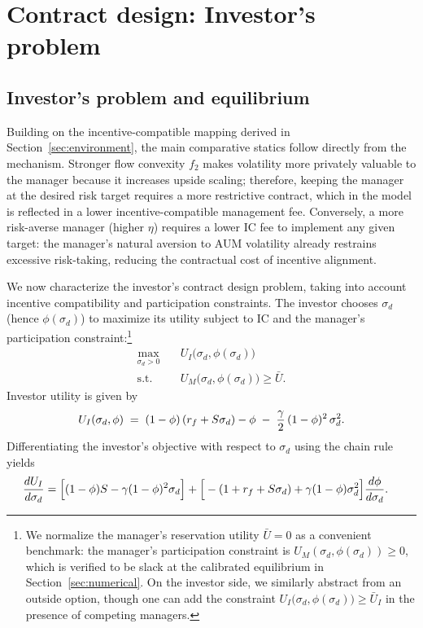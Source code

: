 \section{Contract design: Investor's problem}
\label{sec:contract}
\subsection{Investor's problem and equilibrium}
\label{sec:investor}

Building on the incentive-compatible mapping derived in Section~\ref{sec:environment}, the main comparative statics follow directly from the mechanism. Stronger flow convexity $f_2$ makes volatility more privately valuable to the manager because it increases upside scaling; therefore, keeping the manager at the desired risk target requires a more restrictive contract, which in the model is reflected in a lower incentive-compatible management fee. Conversely, a more risk-averse manager (higher $\eta$) requires a lower IC fee to implement any given target: the manager's natural aversion to AUM volatility already restrains excessive risk-taking, reducing the contractual cost of incentive alignment.

We now characterize the investor's contract design problem, taking into account incentive compatibility and participation constraints. The investor chooses \(\sigma_d\) (hence \(\phi(\sigma_d)\)) to maximize its utility subject to IC and the manager's participation constraint:\footnote{We normalize the manager's reservation utility $\bar{U} = 0$ as a convenient benchmark: the manager's participation constraint is $U_M(\sigma_d, \phi(\sigma_d)) \ge 0$, which is verified to be slack at the calibrated equilibrium in Section~\ref{sec:numerical}. On the investor side, we similarly abstract from an outside option, though one can add the constraint $U_I\big(\sigma_d,\phi(\sigma_d)\big) \geq \bar{U}_I$ in the presence of competing managers.}
\begin{align}
\max_{\sigma_d>0}\quad & U_I\big(\sigma_d,\phi(\sigma_d)\big) \\
\text{s.t.}\quad & U_M\big(\sigma_d,\phi(\sigma_d)\big)\ge \bar U. \nonumber
\end{align}
Investor utility is given by
\begin{equation}
U_I(\sigma_d,\phi) \;=\; (1-\phi)\,(r_f+S\sigma_d) - \phi \;-\; \frac{\gamma}{2}\,(1-\phi)^2\,\sigma_d^2.
\end{equation}
Differentiating the investor's objective with respect to $\sigma_d$ using the chain rule yields
\begin{align}
\frac{d U_I}{d \sigma_d} &= \Big[(1-\phi)S - \gamma(1-\phi)^2\sigma_d\Big] + \Big[-(1+r_f+S\sigma_d) + \gamma(1-\phi)\sigma_d^2\Big]\frac{d\phi}{d\sigma_d}. \label{eq:investor-FOC}
\end{align}

